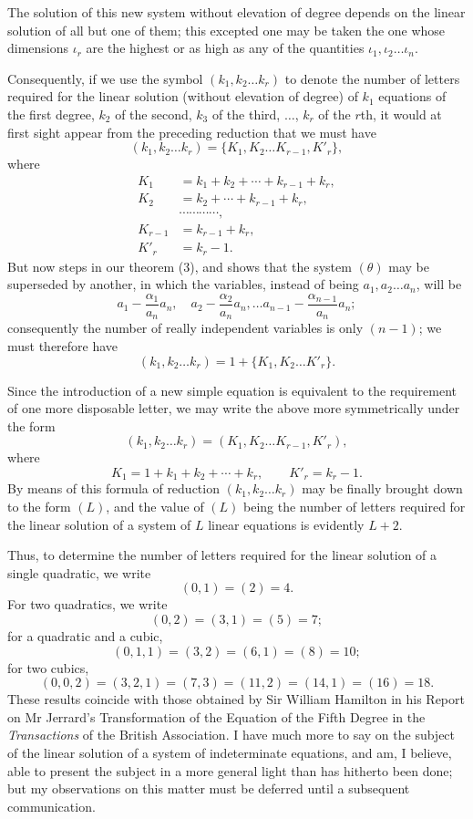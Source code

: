 \documentclass[11pt]{article}
\newcommand{\sourcepage}[1]{\marginpar{\scriptsize p.~#1}}
\begin{document}
{{The solution of this new system without elevation of degree depends on the linear solution of all but one of them; this excepted one may be taken the one whose dimensions $\iota_r$ are the highest or as high as any of the quantities $\iota_1,\iota_2\ldots\iota_n$.

Consequently, if we use the symbol $(k_1,k_2\ldots k_r)$ to denote the number of letters required for the linear solution (without elevation of degree) of $k_1$ equations of the first degree, $k_2$ of the second, $k_3$ of the third, $\ldots$, $k_r$ of the $r$th, it would at first sight appear from the preceding reduction that we must have
\[
 (k_1,k_2\ldots k_r)=\{K_1,K_2\ldots K_{r-1},K'_r\},
\]
where
\[
\begin{aligned}
K_1&=k_1+k_2+\cdots+k_{r-1}+k_r,\\
K_2&=k_2+\cdots+k_{r-1}+k_r,\\
&\cdots\cdots\cdots\cdots,\\
K_{r-1}&=k_{r-1}+k_r,\\
K'_r&=k_r-1.
\end{aligned}
\]
But now steps in our theorem (3), and shows that the system $(\theta)$ may be superseded by another, in which the variables, instead of being $a_1,a_2\ldots a_n$, will be
\[
 a_1-\frac{\alpha_1}{a_n}a_n,
 \quad
 a_2-\frac{\alpha_2}{a_n}a_n,
 \ldots
 a_{n-1}-\frac{\alpha_{n-1}}{a_n}a_n;
\]
consequently the number of really independent variables is only $(n-1)$; we must therefore have
\[
 (k_1,k_2\ldots k_r)=1+\{K_1,K_2\ldots K'_r\}.
\]

\sourcepage{180}
Since the introduction of a new simple equation is equivalent to the requirement of one more disposable letter, we may write the above more symmetrically under the form
\[
 (k_1,k_2\ldots k_r)=(K_1,K_2\ldots K_{r-1},K'_r),
\]
where
\[
 K_1=1+k_1+k_2+\cdots+k_r,
 \qquad
 K'_r=k_r-1.
\]
By means of this formula of reduction $(k_1,k_2\ldots k_r)$ may be finally brought down to the form $(L)$, and the value of $(L)$ being the number of letters required for the linear solution of a system of $L$ linear equations is evidently $L+2$.

Thus, to determine the number of letters required for the linear solution of a single quadratic, we write
\[
 (0,1)=(2)=4.
\]
For two quadratics, we write
\[
 (0,2)=(3,1)=(5)=7;
\]
for a quadratic and a cubic,
\[
 (0,1,1)=(3,2)=(6,1)=(8)=10;
\]
for two cubics,
\[
 (0,0,2)=(3,2,1)=(7,3)=(11,2)=(14,1)=(16)=18.
\]
These results coincide with those obtained by Sir William Hamilton in his Report on Mr Jerrard's Transformation of the Equation of the Fifth Degree in the \emph{Transactions} of the British Association. I have much more to say on the subject of the linear solution of a system of indeterminate equations, and am, I believe, able to present the subject in a more general light than has hitherto been done; but my observations on this matter must be deferred until a subsequent communication.


}}
\end{document}

